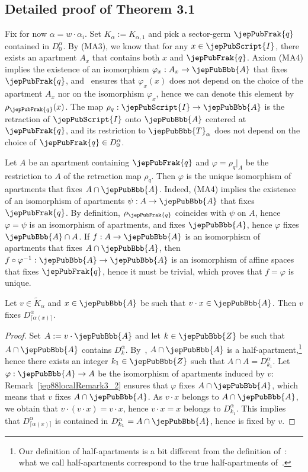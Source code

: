 \subsection{Detailed proof of Theorem 3.1}
Fix for now $\alpha=w\cdot\alpha_i$. Set $K_\alpha:=K_{\alpha,1}$ and pick a sector-germ $\jepPubFrak{q}$ contained in $D_0^\alpha$. By (MA3), we know that for any $x\in\jepPubScript{I}$, there exists an apartment $A_x$ that contains both $x$ and $\jepPubFrak{q}$. Axiom (MA4) implies the existence of an isomorphism $\varphi_x:A_x\to\jepPubBbb{A}$ that fixes $\jepPubFrak{q}$, and~\cite[\S2.6]{jep88refRou11} ensures that $\varphi_x(x)$ does not depend on the choice of the apartment $A_x$ nor on the isomorphism $\varphi_x$, hence we can denote this element by $\rho_{\jepPubFrak{q}}(x)$. The map $\rho_q:\jepPubScript{I}\to\jepPubBbb{A}$ is the retraction of $\jepPubScript{I}$ onto $\jepPubBbb{A}$ centered at $\jepPubFrak{q}$, and its restriction to $\jepPubBbb{T}_\alpha$ does not depend on the choice of $\jepPubFrak{q}\in D_0^\alpha$.
\begin{remark}\label{jep88localRemark3_2}
Let $A$ be an apartment containing $\jepPubFrak{q}$ and $\varphi=\rho_q|_A$ be the restriction to $A$ of the retraction map $\rho_q$. Then $\varphi$ is the unique isomorphism of apartments that fixes $A\cap\jepPubBbb{A}$. Indeed, (MA4) implies the existence of an isomorphism of apartments $\psi:A\to\jepPubBbb{A}$ that fixes $\jepPubFrak{q}$. By definition, $\rho_{\jepPubFrak{q}}$ coincides with $\psi$ on $A$, hence $\varphi=\psi$ is an isomorphism of apartments, and fixes $\jepPubBbb{A}$, hence $\varphi$ fixes $\jepPubBbb{A}\cap A$. If $f:A\to\jepPubBbb{A}$ is an isomorphism of apartments that fixes $A\cap\jepPubBbb{A}$, then $f\circ\varphi^{-1}:\jepPubBbb{A}\to\jepPubBbb{A}$ is an isomorphism of affine spaces that fixes $\jepPubFrak{q}$, hence it must be trivial, which proves that $f=\varphi$ is unique.
\end{remark}
\begin{lemma}\label{jep88localLemma3_3}
Let $v\in\widetilde{K}_\alpha$ and $x\in\jepPubBbb{A}$ be such that $v\cdot x\in\jepPubBbb{A}$. Then $v$ fixes $D_{\lceil\alpha(x)\rceil}^\alpha$.
\end{lemma}
\begin{proof}
Set $A:=v\cdot\jepPubBbb{A}$ and let $k\in\jepPubBbb{Z}$ be such that $A\cap\jepPubBbb{A}$ contains $D_k^\alpha$. By~\cite[Lem.~3.2]{jep88refHeb16}, $A\cap\jepPubBbb{A}$ is a half-apartment,\footnote{Our definition of half-apartments is a bit different from the definition of~\cite{jep88refHeb16}: what we call half-apartments correspond to the true half-apartments of~\cite{jep88refHeb16}.} hence there exists an integer $k_1\in\jepPubBbb{Z}$ such that $A\cap A=D_{k_1}^\alpha$. Let $\varphi:\jepPubBbb{A}\to A$ be the isomorphism of apartments induced by $v$: Remark~\ref{jep88localRemark3_2} ensures that $\varphi$ fixes $A\cap\jepPubBbb{A}$, which means that $v$ fixes $A\cap\jepPubBbb{A}$. As $v\cdot x$ belongs to $A\cap\jepPubBbb{A}$, we obtain that $v\cdot(v\cdot x)=v\cdot x$, hence $v\cdot x=x$ belongs to $D_{k_1}^\alpha$. This implies that $D_{\lceil\alpha(x)\rceil}^\alpha$ is contained in $D_{k_1}^\alpha=A\cap\jepPubBbb{A}$, hence is fixed by $v$.
\end{proof}
